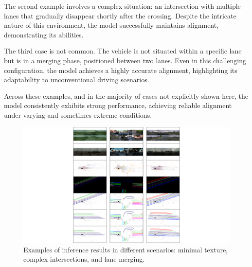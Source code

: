 The second example involves a complex situation: an intersection with multiple lanes that gradually disappear shortly after the crossing. Despite the intricate nature of this environment, the model successfully maintains alignment, demonstrating its abilities.

The third case is not common. The vehicle is not situated within a specific lane but is in a merging phase, positioned between two lanes. Even in this challenging configuration, the model achieves a highly accurate alignment, highlighting its adaptability to unconventional driving scenarios.

Across these examples, and in the majority of cases not explicitly shown here, the model consistently exhibits strong performance, achieving reliable alignment under varying and sometimes extreme conditions.
\begin{figure}[H]
    \centering
    \includegraphics[width=1\linewidth]{LateX//figs/bev_inference.pdf}
    \caption{Examples of inference results in different scenarios: minimal texture, complex intersections, and lane merging.}
    \label{fig:bev_inference}
\end{figure}